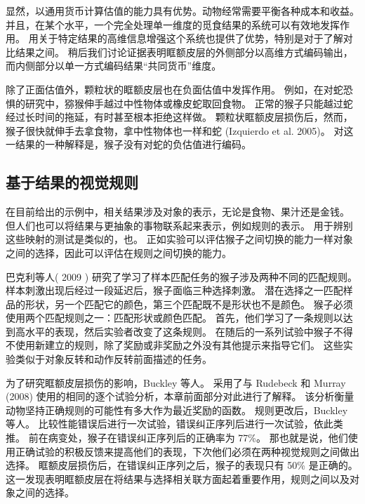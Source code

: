 显然，以通用货币计算估值的能力具有优势。动物经常需要平衡各种成本和收益。
并且，在某个水平，一个完全处理单一维度的觅食结果的系统可以有效地发挥作用。
用关于特定结果的高维信息增强这个系统也提供了优势，特别是对于了解对比结果之间。
稍后我们讨论证据表明眶额皮层的外侧部分以高维方式编码输出，而内侧部分以单一方式编码结果“共同货币”维度。\par


除了正面估值外，颗粒状的眶额皮层也在负面估值中发挥作用。
例如，在对蛇恐惧的研究中，猕猴伸手越过中性物体或橡皮蛇取回食物。
正常的猴子只能越过蛇经过长时间的拖延，有时甚至根本拒绝这样做。
颗粒状眶额皮层损伤后，然而，猴子很快就伸手去拿食物，拿中性物体也一样和蛇 (Izquierdo et al. 2005)。
对这一结果的一种解释是，猴子没有对蛇的负估值进行编码。
\par



\subsection{基于结果的视觉规则}

在目前给出的示例中，相关结果涉及对象的表示，无论是食物、果汁还是金钱。
但人们也可以将结果与更抽象的事物联系起来表示，例如规则的表示。
用于辨别这些映射的测试是类似的，也。
正如实验可以评估猴子之间切换的能力一样对象之间的选择，因此可以评估在规则之间切换的能力。\par


巴克利等人( 2009 ) 研究了学习了样本匹配任务的猴子涉及两种不同的匹配规则。
样本刺激出现后经过一段延迟后，猴子面临三种选择刺激。
潜在选择之一匹配样品的形状，另一个匹配它的颜色，第三个匹配既不是形状也不是颜色。
猴子必须使用两个匹配规则之一：匹配形状或颜色匹配。
首先，他们学习了一条规则以达到高水平的表现，然后实验者改变了这条规则。
在随后的一系列试验中猴子不得不使用新建立的规则，除了奖励或非奖励之外没有其他提示来指导它们。
这些实验类似于对象反转和动作反转前面描述的任务。\par


为了研究眶额皮层损伤的影响，Buckley 等人。
采用了与 Rudebeck 和 Murray (2008) 使用的相同的逐个试验分析，本章前面部分对此进行了解释。
该分析衡量动物坚持正确规则的可能性有多大作为最近奖励的函数。
规则更改后，Buckley 等人。
比较性能错误后进行一次试验，错误纠正序列后进行一次试验，依此类推。
前在病变处，猴子在错误纠正序列后的正确率为 77\%。
那也就是说，他们使用正确试验的积极反馈来提高他们的表现，下次他们必须在两种视觉规则之间做出选择。
眶额皮层损伤后，在错误纠正序列之后，猴子的表现只有 50\% 是正确的。
这一发现表明眶额皮层在将结果与选择相关联方面起着重要作用，规则之间以及对象之间的选择。\par



